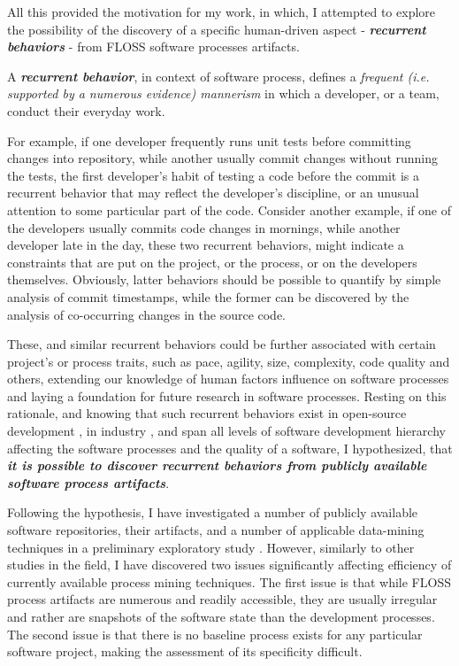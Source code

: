All this provided the motivation for my work, in which, I attempted to explore the possibility of the discovery 
of a specific human-driven aspect - \textit{\textbf{recurrent behaviors}} - from FLOSS software processes artifacts.
\begin{defn}\label{def_process}
A \textbf{\textit{recurrent behavior}}, in context of software process, defines a \textit{frequent 
(i.e. supported by a numerous evidence) mannerism} in which a developer, or a team, conduct their everyday work.
\end{defn}

For example, if one developer frequently runs unit tests before committing 
changes into repository, while another usually commit changes without running the tests, the first developer's
habit of testing a code before the commit is a recurrent behavior that may reflect the developer's discipline,
or an unusual attention to some particular part of the code. 
Consider another example, if one of the developers usually commits code changes in mornings, while another 
developer late in the day, these two recurrent behaviors, might indicate a constraints that are put on the 
project, or the process, or on the developers themselves.
Obviously, latter behaviors should be possible to quantify by simple analysis of commit timestamps, while 
the former can be discovered by the analysis of co-occurring changes in the source code. 

These, and similar recurrent behaviors could be further associated with certain project's or process 
traits, such as pace, agility, size, complexity, code quality and others, extending our knowledge of human 
factors influence on software processes and laying a foundation for future research in software processes.
Resting on this rationale, and knowing that such recurrent behaviors exist in open-source development 
\cite{citeulike:200721}, in industry \cite{citeulike:5090131}, and span all levels of software development 
hierarchy \cite{citeulike:8347315} affecting the software processes and the quality of a software, 
I hypothesized, that \textbf{\textit{it is possible to discover recurrent behaviors from publicly 
available software process artifacts}}. 

Following the hypothesis, I have investigated a number of publicly available software repositories,
their artifacts, and a number of applicable data-mining techniques in a preliminary exploratory study 
\cite{csdl2-10-09}. However, similarly to other studies in the field, I have discovered two issues 
significantly affecting efficiency of currently available process mining techniques. 
The first issue is that while FLOSS process artifacts are numerous and readily accessible, 
they are usually irregular and rather are snapshots of the software state than the development processes. 
The second issue is that there is no baseline process exists for any particular software project,
making the assessment of its specificity difficult.

